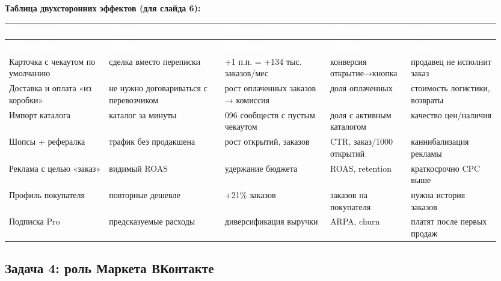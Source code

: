 \documentclass[10pt,a4paper]{article}
\begin{document}
\noindent\textbf{Таблица двухсторонних эффектов (для слайда 6):}\par\vspace{4pt}

\begingroup
\footnotesize
\setlength{\tabcolsep}{3pt}
\renewcommand{\arraystretch}{1.12}
\begin{longtable}{@{}>{\raggedright\arraybackslash}p{0.1926\linewidth}>{\raggedright\arraybackslash}p{0.2287\linewidth}>{\raggedright\arraybackslash}p{0.2046\linewidth}>{\raggedright\arraybackslash}p{0.1504\linewidth}>{\raggedright\arraybackslash}p{0.1745\linewidth}@{}}
\rowcolor{blue}
\textcolor{white}{\textbf{Инструмент}} & \textcolor{white}{\textbf{Бизнес}} & \textcolor{white}{\textbf{ВКонтакте}} & \textcolor{white}{\textbf{Метрика}} & \textcolor{white}{\textbf{Риск}} \\
\endfirsthead
\rowcolor{blue}
\textcolor{white}{\textbf{Инструмент}} & \textcolor{white}{\textbf{Бизнес}} & \textcolor{white}{\textbf{ВКонтакте}} & \textcolor{white}{\textbf{Метрика}} & \textcolor{white}{\textbf{Риск}} \\
\endhead
\hline
Карточка с чекаутом по умолчанию & сделка вместо переписки & +1 п.п. = +134 тыс. заказов/мес & конверсия открытие→кнопка & продавец не исполнит заказ \\
Доставка и оплата «из коробки» & не нужно договариваться с перевозчиком & рост оплаченных заказов → комиссия & доля оплаченных & стоимость логистики, возвраты \\
Импорт каталога & каталог за минуты & 2 096 сообществ с пустым чекаутом & доля с активным каталогом & качество цен/наличия \\
Шопсы + рефералка & трафик без продакшена & рост открытий, заказов & CTR, заказ/1000 открытий & каннибализация рекламы \\
Реклама с целью «заказ» & видимый ROAS & удержание бюджета & ROAS, retention & краткосрочно CPC выше \\
Профиль покупателя & повторные дешевле & +21\% заказов & заказов на покупателя & нужна история заказов \\
Подписка Pro & предсказуемые расходы & диверсификация выручки & ARPA, churn & платят после первых продаж \\
\hline
\end{longtable}
\endgroup
\vspace{4pt}

\subsection{Задача 4: роль Маркета ВКонтакте}
\end{document}

